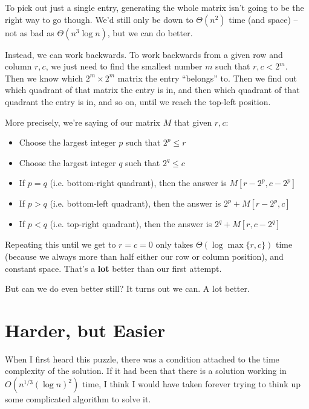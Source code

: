 \documentclass[11pt]{article}
\begin{document}
To pick out just a single entry, generating the whole matrix isn't going to be the right way to go though. We'd still only be down to $\Theta(n^2)$ time (and space) -- not as bad as $\Theta(n^3 \log n)$, but we can do better.

Instead, we can work backwards. To work backwards from a given row and column $r, c$, we just need to find the smallest number $m$ such that $r, c < 2^m$. Then we know which $2^m \times 2^m$ matrix the entry ``belongs'' to. Then we find out which quadrant of that matrix the entry is in, and then which quadrant of that quadrant the entry is in, and so on, until we reach the top-left position.

More precisely, we're saying of our matrix $M$ that given $r, c$:

\begin{itemize}
\item Choose the largest integer $p$ such that $2^p \leq r$

\item Choose the largest integer $q$ such that $2^q \leq c$

\item If $p = q$ (i.e. bottom-right quadrant), then the answer is $M[r - 2^p, c - 2^p]$

\item If $p > q$ (i.e. bottom-left quadrant), then the answer is $2^p + M[r - 2^p, c]$

\item If $p < q$ (i.e. top-right quadrant), then the answer is $2^q + M[r, c - 2^q]$
\end{itemize}

Repeating this until we get to $r = c = 0$ only takes $\Theta(\log \max\lbrace r, c\rbrace)$ time (because we always more than half either our row or column position), and constant space. That's a \textbf{lot} better than our first attempt.

But can we do even better still? It turns out we can. A lot better.

\section{Harder, but Easier}

When I first heard this puzzle, there was a condition attached to the time complexity of the solution. If it had been that there is a solution working in $O(n^{1/3}(\log n)^2)$ time, I think I would have taken forever trying to think up some complicated algorithm to solve it.
\end{document}
